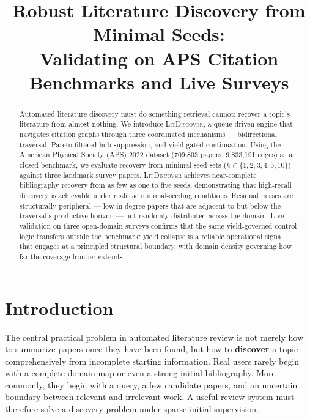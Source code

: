 \documentclass[conference]{IEEEtran}
\title{Robust Literature Discovery from Minimal Seeds:\\
  Validating \ldiscover{} on APS Citation Benchmarks and Live Surveys}
\author{%
  \IEEEauthorblockN{David Goh}
  \IEEEauthorblockA{Department of Computer Science\\University of Toronto\\daveed@cs.toronto.edu}
  \and
  \IEEEauthorblockN{Xiaobai Sun}
  \IEEEauthorblockA{Department of Computer Science\\Duke University\\xiaobai@cs.duke.edu}
}
\newcommand{\ldiscover}{\textsc{LitDiscover}}
\begin{document}
\maketitle

\begin{abstract}
Automated literature discovery must do something retrieval cannot: recover a topic's
literature from almost nothing. We introduce \ldiscover{}, a queue-driven engine
that navigates citation graphs through three coordinated mechanisms --- bidirectional
traversal, Pareto-filtered hub suppression, and yield-gated continuation. Using the
American Physical Society (APS) 2022 dataset (709,803 papers, 9,833,191 edges) as a
closed benchmark, we evaluate recovery from minimal seed sets ($k \in \{1,2,3,4,5,10\}$)
against three landmark survey papers. \ldiscover{} achieves near-complete bibliography
recovery from as few as one to five seeds, demonstrating that high-recall discovery is
achievable under realistic minimal-seeding conditions. Residual misses are structurally
peripheral --- low in-degree papers that are adjacent to but below the traversal's
productive horizon --- not randomly distributed across the domain. Live validation on three
open-domain surveys confirms that the same yield-governed control logic transfers outside
the benchmark: yield collapse is a reliable operational signal that engages at a principled
structural boundary, with domain density governing how far the coverage frontier extends.
\end{abstract}

\section{Introduction}

The central practical problem in automated literature review is not merely how to summarize
papers once they have been found, but how to \textbf{discover} a topic comprehensively from
incomplete starting information. Real users rarely begin with a complete domain map or even
a strong initial bibliography. More commonly, they begin with a query, a few candidate
papers, and an uncertain boundary between relevant and irrelevant work. A useful review
system must therefore solve a discovery problem under sparse initial supervision.
\end{document}
